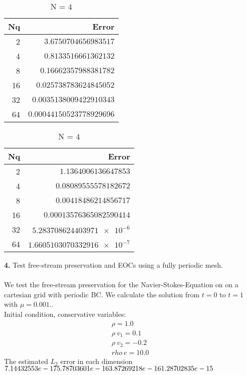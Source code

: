 \documentclass[11pt]{scrartcl}
\begin{document}
\begin{table}[H]
	\parbox{.45\linewidth}{
		\centering
		\begin{tabular}{|r|r|}
			\hline\hline
			\textbf{Nq} & \textbf{Error} \\\hline
			2 & $\num{3.6750704656983517}$   \\
			4 & $\num{0.8133516661362132}$  \\
			8 & $\num{0.16662357988381782}$ \\
			16 & $\num{0.025738783624845052}$ \\
			32 & $\num{0.0035138009422910343}$ \\
			64 & $\num{0.00044150523778929696}$ \\\hline
		\end{tabular}
		\caption{N = $3$}
	}
	\hspace{0.5cm}
	\parbox{.45\linewidth}{
		\centering
		\begin{tabular}{|r|r|}
			\hline\hline
			\textbf{Nq} & \textbf{Error} \\\hline
			2 & $\num{1.1364006136647853}$   \\
			4 & $\num{0.08089555578182672}$  \\
			8 & $\num{0.00418486214856717}$ \\
			16 & $\num{0.00013576365082590414}$ \\
			32 & $\num{5.283708624403971e-6}$ \\
			64 & $\num{1.6605103070332916e-7}$ \\\hline
		\end{tabular}
		\caption{N = $4$}
	}
\end{table}


\textbf{4.} Test free-stream preservation and EOCs using a fully periodic mesh.\\
\\
We test the free-stream preservation for the Navier-Stokes-Equation on on a cartesian grid with periodic BC.
We calculate the solution from $t=0$ to $t=1$ with $\mu = 0.001$..\\
Initial condition, conservative variables:
\begin{align*}
	\rho = 1.0 \\
  	\rho \ v_1 = 0.1 \\
  	\rho \ v_2 = -0.2 \\
  	rho \ e = 10.0
\end{align*}
The estimated $L_2$ error in each dimension \\
$ 7.14432553e-17 \\ 5.78703601e-16\\ 3.87269218e-16  \\ 1.28702835e-15$ \\
\end{document}
